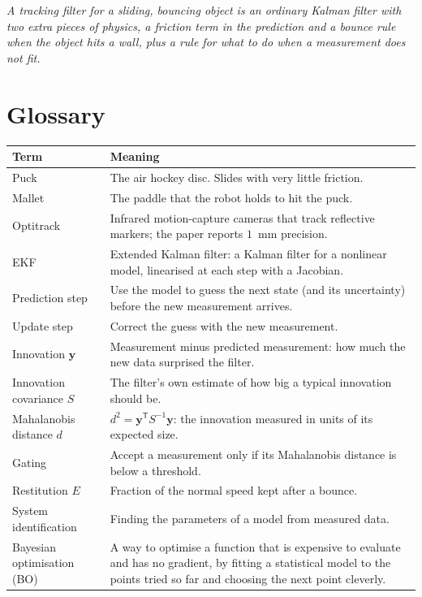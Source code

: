 \documentclass[11pt,a4paper]{article}
\begin{document}
\begin{idea}
\emph{A tracking filter for a sliding, bouncing object is an ordinary Kalman filter with two
extra pieces of physics, a friction term in the prediction and a bounce rule when the object hits
a wall, plus a rule for what to do when a measurement does not fit.}
\end{idea}

\section{Glossary}

\begin{center}
\begin{tabularx}{\textwidth}{@{}l X@{}}
\toprule
Term & Meaning \\
\midrule
Puck & The air hockey disc. Slides with very little friction. \\
Mallet & The paddle that the robot holds to hit the puck. \\
Optitrack & Infrared motion-capture cameras that track reflective markers; the paper reports $1$~mm precision. \\
EKF & Extended Kalman filter: a Kalman filter for a nonlinear model, linearised at each step with a Jacobian. \\
Prediction step & Use the model to guess the next state (and its uncertainty) before the new measurement arrives. \\
Update step & Correct the guess with the new measurement. \\
Innovation $\bm y$ & Measurement minus predicted measurement: how much the new data surprised the filter. \\
Innovation covariance $S$ & The filter's own estimate of how big a typical innovation should be. \\
Mahalanobis distance $d$ & $d^2=\bm y^{\mathsf T}S^{-1}\bm y$: the innovation measured in units of its expected size. \\
Gating & Accept a measurement only if its Mahalanobis distance is below a threshold. \\
Restitution $E$ & Fraction of the normal speed kept after a bounce. \\
System identification & Finding the parameters of a model from measured data. \\
Bayesian optimisation (BO) & A way to optimise a function that is expensive to evaluate and has no gradient, by fitting a statistical model to the points tried so far and choosing the next point cleverly. \\

\end{tabularx}
\end{center}
\end{document}
